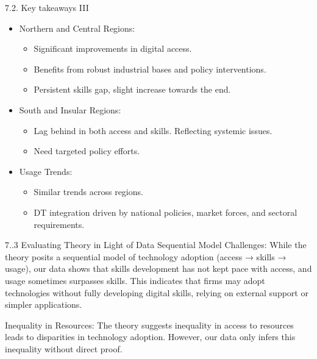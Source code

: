 \documentclass[
  ignorenonframetext,
]{beamer}
\providecommand{\tightlist}{%
  \setlength{\itemsep}{0pt}\setlength{\parskip}{0pt}}
\begin{document}
\begin{frame}{7.2. Key takeaways III}
\label{key-takeaways-iii}
\begin{itemize}
\item
  Northern and Central Regions:

  \begin{itemize}
  \tightlist
  \item
    Significant improvements in digital access.
  \item
    Benefits from robust industrial bases and policy interventions.
  \item
    Persistent skills gap, slight increase towards the end.
  \end{itemize}
\item
  South and Insular Regions:

  \begin{itemize}
  \tightlist
  \item
    Lag behind in both access and skills. Reflecting systemic issues.
  \item
    Need targeted policy efforts.
  \end{itemize}
\item
  Usage Trends:

  \begin{itemize}
  \tightlist
  \item
    Similar trends across regions.
  \item
    DT integration driven by national policies, market forces, and
    sectoral requirements.
  \end{itemize}
\end{itemize}
\end{frame}

\begin{frame}{7..3 Evaluating Theory in Light of Data}
\label{evaluating-theory-in-light-of-data}
Sequential Model Challenges: While the theory posits a sequential model
of technology adoption (access → skills → usage), our data shows that
skills development has not kept pace with access, and usage sometimes
surpasses skills. This indicates that firms may adopt technologies
without fully developing digital skills, relying on external support or
simpler applications.

Inequality in Resources: The theory suggests inequality in access to
resources leads to disparities in technology adoption. However, our data
only infers this inequality without direct proof.
\end{frame}
\end{document}
